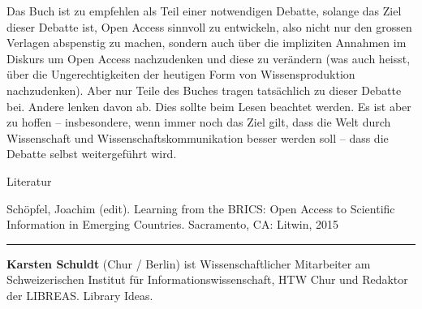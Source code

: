 \documentclass[a4paper,
fontsize=11pt,
oneside,
numbers=noperiodatend,
parskip=half-,
bibliography=totoc,
final
]{scrartcl}
\begin{document}
Das Buch ist zu empfehlen als Teil einer notwendigen Debatte, solange
das Ziel dieser Debatte ist, Open Access sinnvoll zu entwickeln, also
nicht nur den grossen Verlagen abspenstig zu machen, sondern auch über
die impliziten Annahmen im Diskurs um Open Access nachzudenken und diese
zu verändern (was auch heisst, über die Ungerechtigkeiten der heutigen
Form von Wissensproduktion nachzudenken). Aber nur Teile des Buches
tragen tatsächlich zu dieser Debatte bei. Andere lenken davon ab. Dies
sollte beim Lesen beachtet werden. Es ist aber zu hoffen --
insbesondere, wenn immer noch das Ziel gilt, dass die Welt durch
Wissenschaft und Wissenschaftskommunikation besser werden soll -- dass
die Debatte selbst weitergeführt wird.

Literatur

Schöpfel, Joachim (edit). Learning from the BRICS: Open Access to
Scientific Information in Emerging Countries. Sacramento, CA: Litwin,
2015

\begin{center}\rule{0.5\linewidth}{\linethickness}\end{center}

\textbf{Karsten Schuldt} (Chur / Berlin) ist Wissenschaftlicher
Mitarbeiter am Schweizerischen Institut für Informationswissenschaft,
HTW Chur und Redaktor der LIBREAS. Library Ideas.
\end{document}
